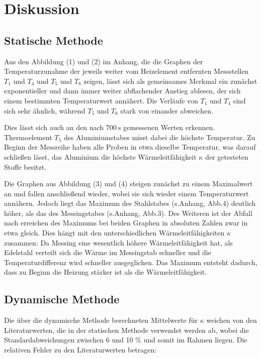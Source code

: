 
\section{Diskussion}
\label{sec:Diskussion}

\subsection{Statische Methode}

Aus den Abbildung (1) und (2) im Anhang, die die Graphen der Temperaturzunahme der jeweils weiter vom Heizelement entfernten Messstellen $T_\text{1}$ und $T_\text{4}$ und $T_\text{5}$ und $T_\text{8}$ zeigen, lässt sich als gemeinsames Merkmal ein zunächst exponentieller und dann immer weiter abflachender Anstieg ablesen, der sich einem bestimmten Temperaturwert annähert.
Die Verläufe von $T_\text{1}$ und $T_\text{4}$ sind sich sehr ähnlich, während $T_\text{5}$ und $T_\text{8}$ stark von einander abweichen.

Dies lässt sich auch an den nach $\SI{700}{\second}$ gemessenen Werten erkennen.
Thermoelement $T_\text{5}$ des Aluminiumstabes misst dabei die höchste Temperatur.
Zu Beginn der Messreihe haben alle Proben in etwa dieselbe Temperatur, was darauf schließen lässt, das Aluminium die höchste Wärmeleitfähigkeit $\kappa$ der getesteten Stoffe besitzt.

Die Graphen aus Abbildung (3) und (4) steigen zunächst zu einem Maximalwert an und fallen anschließend wieder, wobei sie sich wieder einem Temperaturwert annähern.
Jedoch liegt das Maximum des Stahlstabes (s.Anhang, Abb.4)
deutlich höher, als das des Messingstabes (s.Anhang, Abb.3).
Des Weiteren ist der Abfall nach erreichen des Maximums bei beiden Graphen in absoluten Zahlen zwar in etwa gleich.
Dies hängt mit den unterschiedlichen Wärmeleitfähigkeiten $\kappa$ zusammen:
Da Messing eine wesentlich höhere Wärmeleitfähigkeit hat, als Edelstahl verteilt sich die Wärme im Messingstab schneller und die Temperaturdifferenz wird schneller ausgeglichen.
Das Maximum entsteht dadurch, dass zu Beginn die Heizung stärker ist als die Wärmeleitfähigkeit.

\subsection{Dynamische Methode}

Die über die dynamische Methode berechneten Mittelwerte für $\kappa$ weichen von den Literaturwerten, die in der statischen Methode verwendet werden ab, wobei die  Standardabweichungen zwischen 6 und 10 \% und somit im Rahmen liegen. Die relativen Fehler zu den Literaturwerten betragen:

